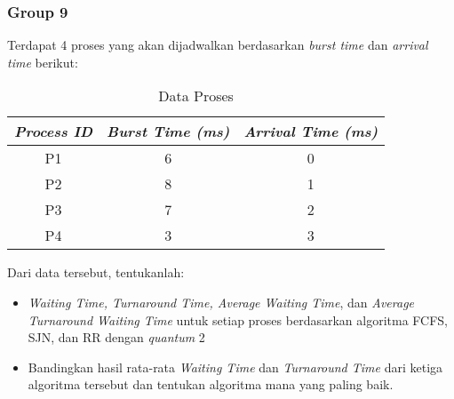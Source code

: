 \documentclass[12pt]{article}
\begin{document}
\subsubsection{Group 9}
Terdapat 4 proses yang akan dijadwalkan berdasarkan \textit{burst time} dan \textit{arrival time} berikut:

\begin{table}[H]
\centering
\begin{tabular}{|c|c|c|}
\hline
\textbf{\textit{Process ID}} & \textbf{\textit{Burst Time (ms)}} & \textbf{\textit{Arrival Time (ms)}} \\
\hline
P1 & 6 & 0 \\
\hline
P2 & 8 & 1 \\
\hline
P3 & 7 & 2 \\
\hline
P4 & 3 & 3 \\
\hline
\end{tabular}
\caption{Data Proses}
\end{table}

Dari data tersebut, tentukanlah:
\begin{itemize}
     \item \textit{Waiting Time, Turnaround Time, Average Waiting Time}, dan \textit{Average Turnaround Waiting Time} untuk setiap proses berdasarkan algoritma FCFS, SJN, dan RR dengan \textit{quantum} 2
    \item Bandingkan hasil rata-rata \textit{Waiting Time} dan \textit{Turnaround Time} dari ketiga algoritma tersebut dan tentukan algoritma mana yang paling baik.
\end{itemize}
\end{document}
